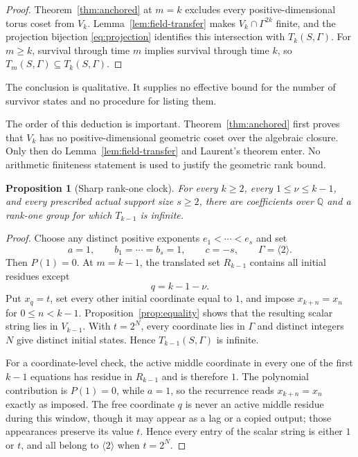 \documentclass[11pt]{article}
\newtheorem{proposition}[theorem]{Proposition}
\theoremstyle{definition}
\theoremstyle{remark}
\newcommand{\Q}{\mathbb{Q}}
\newcommand{\Gam}{\Gamma}
\begin{document}
\begin{proof}
Theorem~\ref{thm:anchored} at $m=k$ excludes every positive-dimensional torus coset from $V_k$.  Lemma~\ref{lem:field-transfer} makes $V_k\cap\Gam^{2k}$ finite, and the projection bijection \eqref{eq:projection} identifies this intersection with $T_k(S,\Gam)$.  For $m\geq k$, survival through time $m$ implies survival through time $k$, so $T_m(S,\Gam)\subseteq T_k(S,\Gam)$.
\end{proof}

The conclusion is qualitative.  It supplies no effective bound for the number of survivor states and no procedure for listing them.

The order of this deduction is important.  Theorem~\ref{thm:anchored} first
proves that $V_k$ has no positive-dimensional geometric coset over the
algebraic closure.  Only then do Lemma~\ref{lem:field-transfer} and Laurent's
theorem enter.  No arithmetic finiteness statement is used to justify the
geometric rank bound.

\begin{proposition}[Sharp rank-one clock]
\label{prop:sharp-clock}
For every $k\geq2$, every $1\leq\nu\leq k-1$, and every prescribed actual support size $s\geq2$, there are coefficients over $\Q$ and a rank-one group for which $T_{k-1}$ is infinite.
\end{proposition}

\begin{proof}
Choose any distinct positive exponents $e_1<\cdots<e_s$ and set
\begin{equation}
a=1,\qquad b_1=\cdots=b_s=1,\qquad c=-s,
\qquad \Gam=\langle2\rangle.
\label{eq:sharp-coefficients}
\end{equation}
Then $P(1)=0$.  At $m=k-1$, the translated set $R_{k-1}$ contains all initial residues except
\begin{equation}
q=k-1-\nu.
\label{eq:free-residue}
\end{equation}
Put $x_q=t$, set every other initial coordinate equal to $1$, and impose
$x_{k+n}=x_n$ for $0\leq n<k-1$.  Proposition~\ref{prop:equality} shows that the resulting scalar string lies in $V_{k-1}$.  With $t=2^N$, every coordinate lies in $\Gam$ and distinct integers $N$ give distinct initial states.  Hence $T_{k-1}(S,\Gam)$ is infinite.

For a coordinate-level check, the active middle coordinate in every one of
the first $k-1$ equations has residue in $R_{k-1}$ and is therefore $1$.
The polynomial contribution is $P(1)=0$, while $a=1$, so the recurrence
reads $x_{k+n}=x_n$ exactly as imposed.  The free coordinate $q$ is never an
active middle residue during this window, though it may appear as a lag or a
copied output; those appearances preserve its value $t$.  Hence every entry
of the scalar string is either $1$ or $t$, and all belong to
$\langle2\rangle$ when $t=2^N$.
\end{proof}
\end{document}

